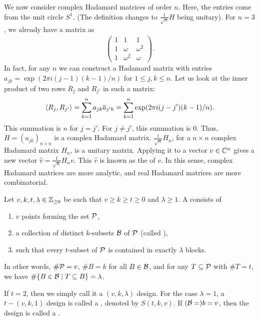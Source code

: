 We now consider complex Hadamard matrices of order $n$. Here, the entries come from the unit circle $S^{1}$. (The definition changes to $\frac{1}{\sqrt{n}} H$ being unitary). For $n = 3$, we already have a matrix as
\begin{align}
    \begin{pmatrix}
        1 & 1 & 1 \\
        1 & \omega & \omega^{2} \\
        1 & \omega^{2} & \omega
    \end{pmatrix}.
\end{align}
In fact, for any $n$ we can construct a Hadamard matrix with entries $a_{jk} = \exp(2\pi i (j-1)(k-1)/n)$ for $1 \leq j,k \leq n$. Let us look at the inner product of two rows $R_{j}$ and $R_{j'}$ in such a matrix:
\begin{align}
    \langle R_{j},R_{j'}\rangle = \sum_{k=1}^{n} a_{jk} \overline{a}_{j'k} = \sum_{k=1}^{n} \exp(2\pi i(j-j')(k-1)/n).
\end{align}
This summation is $n$ for $j = j'$. For $j \neq j'$, this summation is 0. Thus, $H = (a_{jk})_{n \times n}$ is a complex Hadamard matrix. $\frac{1}{\sqrt{n}} H_{n}$, for a $n \times n$ complex Hadamard matrix $H_{n}$, is a unitary matrix. Applying it to a vector $v \in \mathbb{C}^{n}$ gives a new vector $\hat{v} = \frac{1}{\sqrt{n}} H_{n} v$. This $\hat{v}$ is known as the  of $v$. In this sense, complex Hadamard matrices are more analytic, and real Hadamard matrices are more combinatorial.

\begin{definition}
    Let $v,k,t,\lambda \in \mathbb{Z}_{\geq 0}$ be such that $v \geq k \geq t \geq 0$ and $\lambda \geq 1$. A  consists of
    \begin{enumerate}
        \item $v$ points forming the set $\mathcal{P}$,
        \item a collection of distinct $k$-subsets $\mathcal{B}$ of $\mathcal{P}$ (called ),
        \item such that every $t$-subset of $\mathcal{P}$ is contained in exactly $\lambda$ blocks.
    \end{enumerate}
    In other words, $\# \mathcal{P} = v$, $\# B = k$ for all $B \in \mathcal{B}$, and for any $T \subseteq \mathcal{P}$ with $\# T = t$, we have $\# \{B \in \mathcal{B} \mid T \subseteq B\} = \lambda$.
\end{definition}

If $t = 2$, then we simply call it a $(v,k,\lambda)$ design. For the case $\lambda = 1$, a $t-(v,k,1)$ design is called a , denoted by $S(t,k,v)$. If $(\mathcal{B} = ) b = v$, then the design is called a .

